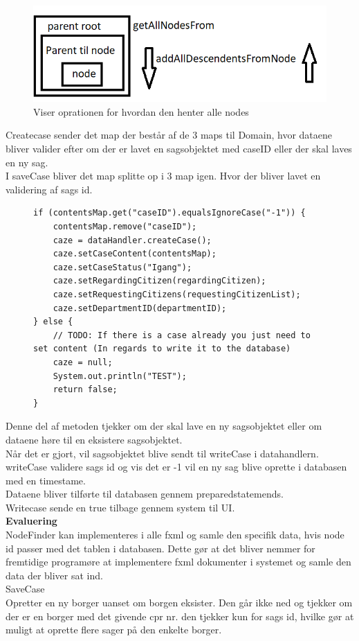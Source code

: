 \begin{figure} [htb!]
	\includegraphics[scale = 0.7]{./PNG/imp/nodes.PNG} 
	\caption{Viser oprationen for hvordan den henter alle nodes}
	\label{fig:nodes}
\end{figure}
Createcase sender det map der består af de 3 maps til Domain, hvor dataene bliver valider efter om der er lavet en sagsobjektet med caseID eller der skal laves en ny sag. \\
I saveCase bliver det map splitte op i 3 map igen. Hvor der bliver lavet en validering af sags id. \\
\begin{figure}[hbt!]
\begin{lstlisting}
if (contentsMap.get("caseID").equalsIgnoreCase("-1")) {
	contentsMap.remove("caseID");
	caze = dataHandler.createCase();
	caze.setCaseContent(contentsMap);
	caze.setCaseStatus("Igang");
	caze.setRegardingCitizen(regardingCitizen);
	caze.setRequestingCitizens(requestingCitizenList);
	caze.setDepartmentID(departmentID);
} else {
	// TODO: If there is a case already you just need to set content (In regards to write it to the database)
	caze = null;
	System.out.println("TEST");
	return false;
}
\end{lstlisting}
\end{figure}

Denne del af metoden tjekker om der skal lave en ny sagsobjektet eller om dataene høre til en eksistere sagsobjektet. \\
Når det er gjort, vil sagsobjektet blive sendt til writeCase i datahandlern.\\
writeCase validere sags id og vis det er -1 vil en ny sag blive oprette i databasen med en timestame. \\
Dataene bliver tilførte til databasen gennem preparedstatemends.\\
Writecase sende en true tilbage gennem system til UI.\\
\textbf{Evaluering }\\
NodeFinder kan implementeres i alle fxml og samle den specifik data, hvis node id passer med det tablen i databasen. Dette gør at det bliver nemmer for fremtidige programøre at implementere fxml dokumenter i systemet og samle den data der bliver sat ind.\\
SaveCase 	\\
Opretter en ny borger uanset om borgen eksister. Den går ikke ned og tjekker om der er en borger med det givende cpr nr. den tjekker kun for sags id, hvilke gør at muligt at oprette flere sager på den enkelte borger. \\
